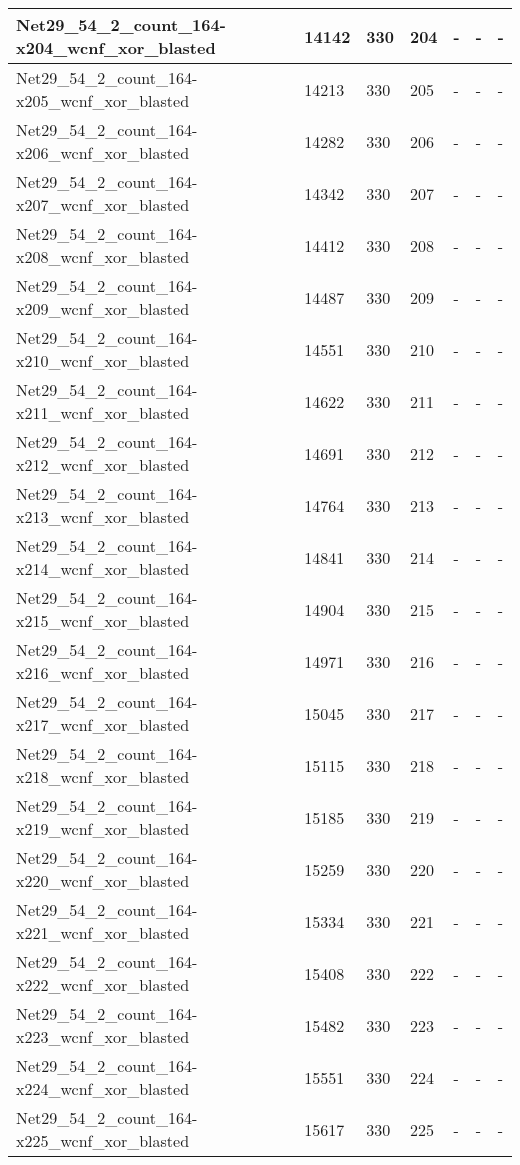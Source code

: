 \begin{scriptsize}
\begin{longtable}{|p{5cm}|l|l|l|l|l|l|}
Net29\_54\_2\_count\_164-x204\_wcnf\_xor\_blasted&14142&330&204&-&-&- \\ \hline 
Net29\_54\_2\_count\_164-x205\_wcnf\_xor\_blasted&14213&330&205&-&-&- \\ \hline 
Net29\_54\_2\_count\_164-x206\_wcnf\_xor\_blasted&14282&330&206&-&-&- \\ \hline 
Net29\_54\_2\_count\_164-x207\_wcnf\_xor\_blasted&14342&330&207&-&-&- \\ \hline 
Net29\_54\_2\_count\_164-x208\_wcnf\_xor\_blasted&14412&330&208&-&-&- \\ \hline 
Net29\_54\_2\_count\_164-x209\_wcnf\_xor\_blasted&14487&330&209&-&-&- \\ \hline 
Net29\_54\_2\_count\_164-x210\_wcnf\_xor\_blasted&14551&330&210&-&-&- \\ \hline 
Net29\_54\_2\_count\_164-x211\_wcnf\_xor\_blasted&14622&330&211&-&-&- \\ \hline 
Net29\_54\_2\_count\_164-x212\_wcnf\_xor\_blasted&14691&330&212&-&-&- \\ \hline 
Net29\_54\_2\_count\_164-x213\_wcnf\_xor\_blasted&14764&330&213&-&-&- \\ \hline 
Net29\_54\_2\_count\_164-x214\_wcnf\_xor\_blasted&14841&330&214&-&-&- \\ \hline 
Net29\_54\_2\_count\_164-x215\_wcnf\_xor\_blasted&14904&330&215&-&-&- \\ \hline 
Net29\_54\_2\_count\_164-x216\_wcnf\_xor\_blasted&14971&330&216&-&-&- \\ \hline 
Net29\_54\_2\_count\_164-x217\_wcnf\_xor\_blasted&15045&330&217&-&-&- \\ \hline 
Net29\_54\_2\_count\_164-x218\_wcnf\_xor\_blasted&15115&330&218&-&-&- \\ \hline 
Net29\_54\_2\_count\_164-x219\_wcnf\_xor\_blasted&15185&330&219&-&-&- \\ \hline 
Net29\_54\_2\_count\_164-x220\_wcnf\_xor\_blasted&15259&330&220&-&-&- \\ \hline 
Net29\_54\_2\_count\_164-x221\_wcnf\_xor\_blasted&15334&330&221&-&-&- \\ \hline 
Net29\_54\_2\_count\_164-x222\_wcnf\_xor\_blasted&15408&330&222&-&-&- \\ \hline 
Net29\_54\_2\_count\_164-x223\_wcnf\_xor\_blasted&15482&330&223&-&-&- \\ \hline 
Net29\_54\_2\_count\_164-x224\_wcnf\_xor\_blasted&15551&330&224&-&-&- \\ \hline 
Net29\_54\_2\_count\_164-x225\_wcnf\_xor\_blasted&15617&330&225&-&-&- \\ \hline 

\end{longtable}
\end{scriptsize}
